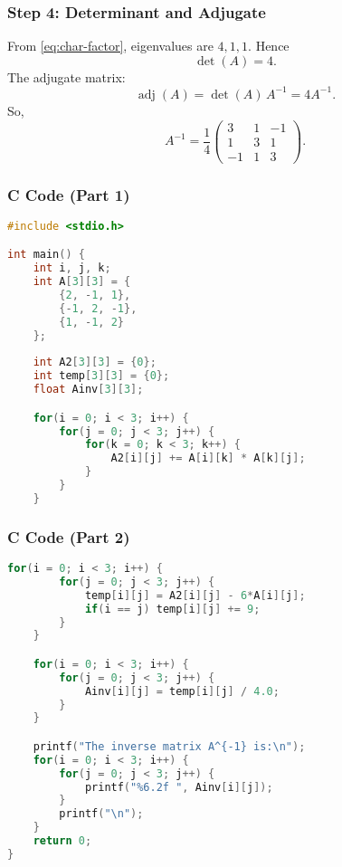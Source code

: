 \documentclass{beamer}
\begin{document}
\begin{frame}
\frametitle{Step 4: Determinant and Adjugate}
From \eqref{eq:char-factor}, eigenvalues are \(4,1,1\). Hence
\begin{equation}\label{eq:det}
\det(A)=4.
\end{equation}
The adjugate matrix:
\[
\operatorname{adj}(A)=\det(A)\,A^{-1}=4A^{-1}.
\]
So,
\begin{equation}\label{eq:inv-final}
A^{-1}=\frac{1}{4}
\begin{pmatrix}
3 & 1 & -1\\
1 & 3 & 1\\
-1 & 1 & 3
\end{pmatrix}.
\end{equation}
\end{frame}

\begin{frame}[fragile]
\frametitle{C Code (Part 1)}
\begin{lstlisting}[language=C]
#include <stdio.h>

int main() {
    int i, j, k;
    int A[3][3] = {
        {2, -1, 1},
        {-1, 2, -1},
        {1, -1, 2}
    };
    
    int A2[3][3] = {0};
    int temp[3][3] = {0};
    float Ainv[3][3];

    for(i = 0; i < 3; i++) {
        for(j = 0; j < 3; j++) {
            for(k = 0; k < 3; k++) {
                A2[i][j] += A[i][k] * A[k][j];
            }
        }
    }
\end{lstlisting}
\end{frame}

\begin{frame}[fragile]
\frametitle{C Code (Part 2)}
\begin{lstlisting}[language=C]
    for(i = 0; i < 3; i++) {
        for(j = 0; j < 3; j++) {
            temp[i][j] = A2[i][j] - 6*A[i][j];
            if(i == j) temp[i][j] += 9;
        }
    }

    for(i = 0; i < 3; i++) {
        for(j = 0; j < 3; j++) {
            Ainv[i][j] = temp[i][j] / 4.0;
        }
    }

    printf("The inverse matrix A^{-1} is:\n");
    for(i = 0; i < 3; i++) {
        for(j = 0; j < 3; j++) {
            printf("%6.2f ", Ainv[i][j]);
        }
        printf("\n");
    }
    return 0;
}
\end{lstlisting}
\end{frame}
\end{document}
